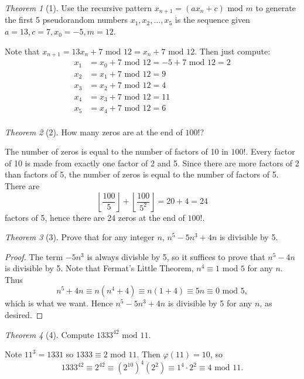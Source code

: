 \documentclass[12pt]{article}
\theoremstyle{remark}
\theoremstyle{named}
\newtheorem*{theorem}{Theorem}
\renewcommand{\mod}{\text{ mod }}
\newcommand{\floor}[1]{\left\lfloor#1\right\rfloor}
\begin{document}
\begin{theorem}[1]
    Use the recursive pattern \(x_{n + 1} = (a x_n + c) \mod m\) to generate the first 5 pseudorandom numbers \(x_1, x_2, \dots, x_5\) is the sequence given \(a = 13, c = 7, x_0 = -5, m = 12\).
\end{theorem}

Note that \(x_{n + 1} = 13 x_n + 7 \mod 12 = x_n + 7 \mod 12\). Then just compute: 
\begin{align*}
    x_1 &= x_0 + 7 \mod 12 = -5 + 7 \mod 12 = 2 \\
    x_2 &= x_1 + 7 \mod 12 = 9 \\
    x_3 &= x_2 + 7 \mod 12 = 4 \\
    x_4 &= x_3 + 7 \mod 12 = 11 \\
    x_5 &= x_4 + 7 \mod 12 = 6 \\
\end{align*}

\begin{theorem}[2]
    How many zeros are at the end of \(100!\)?
\end{theorem}

The number of zeros is equal to the number of factors of 10 in \(100!\). Every factor of 10 is made from exactly one factor of 2 and 5. Since there are more factors of 2 than factors of 5, the number of zeros is equal to the number of factors of 5. There are 
\[\floor{\frac{100}{5}} + \floor{\frac{100}{5^2}} = 20 + 4 = 24\]
factors of 5, hence there are 24 zeros at the end of \(100!\).
\newline

\begin{theorem}[3]
    Prove that for any integer \(n\), \(n^5 - 5n^3 + 4n\) is divisible by 5.
\end{theorem}

\begin{proof}
    The term \(-5n^3\) is always divisble by 5, so it suffices to prove that \(n^5 - 4n\) is divisible by 5. Note that Fermat's Little Theorem, \(n^4 \equiv 1 \mod 5\) for any \(n\). Thus 
    \[n^5 + 4n \equiv n(n^4 + 4) \equiv n(1 + 4) \equiv 5n \equiv 0 \mod 5,\]
    which is what we want. Hence \(n^5 - 5n^3 + 4n\) is divisible by 5 for any \(n\), as desired.
\end{proof}

\begin{theorem}[4]
    Compute \(1333^{42} \mod 11\).
\end{theorem}

Note \(11^3 = 1331\) so \(1333 \equiv 2 \mod 11\). Then \(\varphi(11) = 10\), so 
\[1333^{42} \equiv 2^{42} \equiv (2^{10})^4 (2^2) \equiv 1^4 \cdot 2^2 \equiv 4 \mod 11.\]
\end{document}
